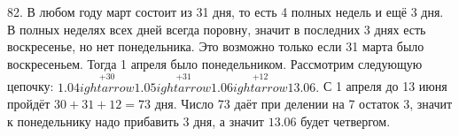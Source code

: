 82. В любом году март состоит из 31 дня, то есть 4 полных недель и ещё 3 дня. В полных неделях всех дней всегда поровну, значит в последних 3 днях есть воскресенье, но нет понедельника. Это возможно только если 31 марта было воскресеньем. Тогда 1 апреля было понедельником. Рассмотрим следующую цепочку:
$1.04\stackrel{+30}{
ightarrow}1.05\stackrel{+31}{
ightarrow}1.06\stackrel{+12}{
ightarrow}13.06.$ С 1 апреля до 13 июня пройдёт $30+31+12=73$ дня. Число 73 даёт при делении на 7 остаток 3, значит к понедельнику надо прибавить 3 дня, а значит $13.06$ будет четвергом.\\
